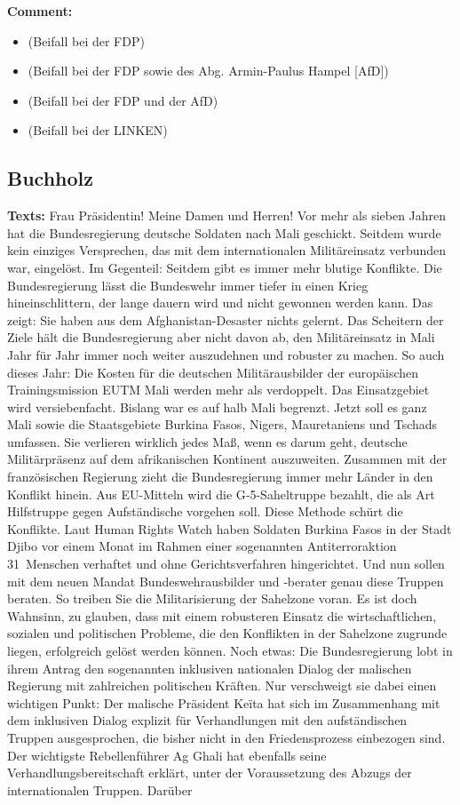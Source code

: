 \documentclass{article}
\begin{document}
\noindent\textbf{Comment:}
\begin{itemize}
    \setlength\itemsep{-3pt}
    \item (Beifall bei der FDP)
    \setlength\itemsep{-3pt}
    \item (Beifall bei der FDP sowie des Abg. Armin-Paulus Hampel [AfD])
    \setlength\itemsep{-3pt}
    \item (Beifall bei der FDP und der AfD)
    \setlength\itemsep{-3pt}
    \item (Beifall bei der LINKEN)
\end{itemize}
\subsection{Buchholz}
\noindent\textbf{Texts:} Frau Präsidentin! Meine Damen und Herren! Vor mehr als sieben Jahren hat die Bundesregierung deutsche Soldaten nach Mali geschickt. Seitdem wurde kein einziges Versprechen, das mit dem internationalen Militäreinsatz verbunden war, eingelöst. Im Gegenteil: Seitdem gibt es immer mehr blutige Konflikte. Die Bundesregierung lässt die Bundeswehr immer tiefer in einen Krieg hineinschlittern, der lange dauern wird und nicht gewonnen werden kann. Das zeigt: Sie haben aus dem Afghanistan-Desaster nichts gelernt.  Das Scheitern der Ziele hält die Bundesregierung aber nicht davon ab, den Militäreinsatz in Mali Jahr für Jahr immer noch weiter auszudehnen und robuster zu machen. So auch dieses Jahr: Die Kosten für die deutschen Militärausbilder der europäischen Trainingsmission EUTM Mali werden mehr als verdoppelt. Das Einsatzgebiet wird versiebenfacht. Bislang war es auf halb Mali begrenzt. Jetzt soll es ganz Mali sowie die Staatsgebiete Burkina Fasos, Nigers, Mauretaniens und Tschads umfassen. Sie verlieren wirklich jedes Maß, wenn es darum geht, deutsche Militärpräsenz auf dem afrikanischen Kontinent auszuweiten.  Zusammen mit der französischen Regierung zieht die Bundesregierung immer mehr Länder in den Konflikt hinein. Aus EU-Mitteln wird die G‑5-Saheltruppe bezahlt, die als Art Hilfstruppe gegen Aufständische vorgehen soll. Diese Methode schürt die Konflikte. Laut Human Rights Watch haben Soldaten Burkina Fasos in der Stadt Djibo vor einem Monat im Rahmen einer sogenannten Antiterroraktion 31 Menschen verhaftet und ohne Gerichtsverfahren hingerichtet. Und nun sollen mit dem neuen Mandat Bundeswehrausbilder und ‑berater genau diese Truppen beraten. So treiben Sie die Militarisierung der Sahelzone voran. Es ist doch Wahnsinn, zu glauben, dass mit einem robusteren Einsatz die wirtschaftlichen, sozialen und politischen Probleme, die den Konflikten in der Sahelzone zugrunde liegen, erfolgreich gelöst werden können.  Noch etwas: Die Bundesregierung lobt in ihrem Antrag den sogenannten inklusiven nationalen Dialog der malischen Regierung mit zahlreichen politischen Kräften. Nur verschweigt sie dabei einen wichtigen Punkt: Der malische Präsident Keïta hat sich im Zusammenhang mit dem inklusiven Dialog explizit für Verhandlungen mit den aufständischen Truppen ausgesprochen, die bisher nicht in den Friedensprozess einbezogen sind. Der wichtigste Rebellenführer Ag Ghali hat ebenfalls seine Verhandlungsbereitschaft erklärt, unter der Voraussetzung des Abzugs der internationalen Truppen. Darüber 
\end{document}
